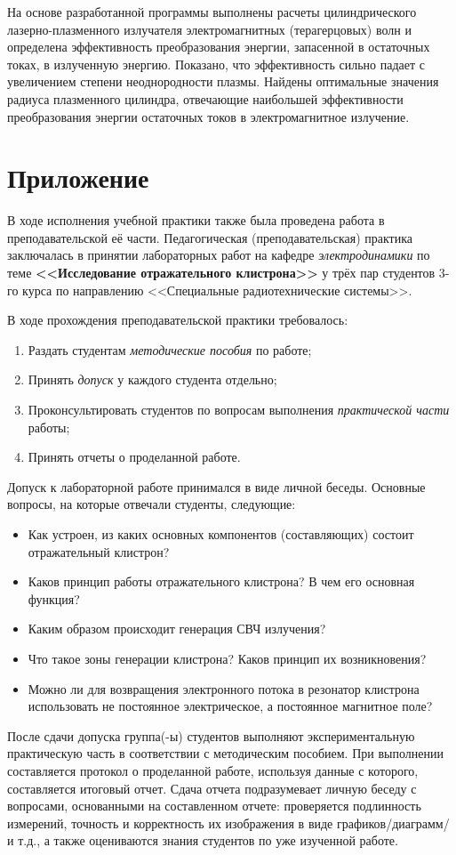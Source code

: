 \documentclass[a4paper]{article}
\begin{document}
На основе разработанной программы выполнены расчеты цилиндрического лазерно-плазменного излучателя электромагнитных (терагерцовых) волн и определена эффективность преобразования энергии,  запасенной в остаточных токах, в излученную энергию. Показано, что эффективность сильно падает с увеличением степени неоднородности плазмы. Найдены оптимальные значения радиуса плазменного цилиндра, отвечающие наибольшей эффективности преобразования энергии остаточных токов в электромагнитное излучение.

%

\newpage
\section*{Приложение}

В ходе исполнения учебной практики также была проведена работа в преподавательской её части. Педагогическая (преподавательская) практика заключалась в принятии лабораторных работ на кафедре \textit{электродинамики} по теме \textbf{<<Исследование отражательного клистрона>>} у трёх пар студентов 3-го курса по направлению <<Специальные радиотехнические системы>>.  

В ходе прохождения преподавательской практики требовалось:
\begin{enumerate}
	\item Раздать студентам \textit{методические пособия} по работе;
	\item Принять \textit{допуск} у каждого студента отдельно;
	\item Проконсультировать студентов по вопросам выполнения \textit{практической части} работы;
	\item Принять отчеты о проделанной работе.
\end{enumerate}

Допуск к лабораторной работе принимался в виде личной беседы. Основные вопросы, на которые отвечали студенты, следующие:
\begin{itemize}
	\item Как устроен, из каких основных компонентов (составляющих) состоит отражательный клистрон?
	\item Каков принцип работы отражательного клистрона? В чем его основная функция?
	\item Каким образом происходит генерация СВЧ излучения?
	\item Что такое зоны генерации клистрона? Каков принцип их возникновения?
	\item Можно ли для возвращения электронного потока в резонатор клистрона использовать не постоянное электрическое, а постоянное магнитное поле?
\end{itemize}

После сдачи допуска группа(-ы) студентов выполняют экспериментальную практическую часть в соответствии с методическим пособием. При выполнении составляется протокол о проделанной работе, используя данные с которого, составляется итоговый отчет. Сдача отчета подразумевает личную беседу с вопросами, основанными на составленном отчете: проверяется подлинность измерений, точность и корректность их изображения в виде графиков/диаграмм/и т.д., а также оцениваются знания студентов по уже изученной работе.

\newpage
\printbibliography
\end{document}
